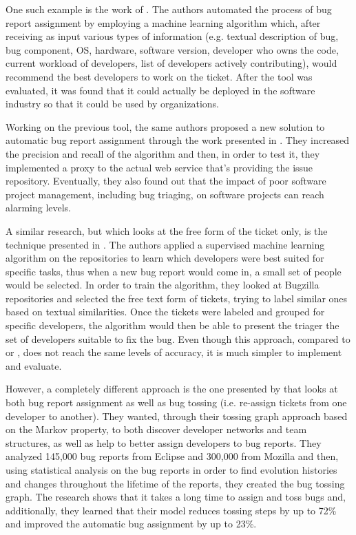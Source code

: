 \documentclass{mprop}
\begin{document}
One such example is the work of \citet{anvik2006automating}. The authors
automated the process of bug report assignment by employing a machine learning 
algorithm which, after receiving as input various types of information (e.g. 
textual description of bug, bug component, OS, hardware, software version, 
developer who owns the code, current workload of developers, list of developers 
actively contributing), would recommend the best developers to work on the ticket. 
After the tool was evaluated, it was found that it could actually be deployed
in the software industry so that it could be used by organizations.

Working on the previous tool, the same authors proposed a new solution to automatic
bug report assignment through the work presented in \citet{anvik2011reducing}.
They increased the precision and recall of the algorithm and then, in order to 
test it, they implemented a proxy to the actual web service that's providing the
issue repository. Eventually, they also found out that the impact of poor
software project management, including bug triaging, on software projects can
reach alarming levels.

A similar research, but which looks at the free form of the ticket only, is
the technique presented in \citet{anvik2006should}. The authors applied a 
supervised machine learning algorithm on the repositories to learn which 
developers were best suited for specific tasks, thus when a new bug report would 
come in, a small set of people would be selected. In order to train the algorithm,
they looked at Bugzilla repositories and selected the free text form of tickets, 
trying to label similar ones based on textual similarities. Once the tickets were
labeled and grouped for specific developers, the algorithm would then be able
to present the triager the set of developers suitable to fix the bug. Even though
this approach, compared to \citet{anvik2006automating} or 
\citet{anvik2011reducing}, does not reach the same levels of accuracy, it is much
simpler to implement and evaluate.

However, a completely different approach is the one presented by 
\citet{jeong2009improving} that looks at both bug report assignment as well as bug 
tossing (i.e. re-assign tickets from one developer to another). They wanted, 
through their tossing graph approach based on the Markov property, to both 
discover developer networks and team structures, as well as help to better assign 
developers to bug reports. They analyzed 145,000 bug reports from Eclipse and 
300,000 from Mozilla and then, using statistical analysis on the bug reports in 
order to find evolution histories and changes throughout the lifetime of the 
reports, they created the bug tossing graph. The research shows that it takes a 
long time to assign and toss bugs and, additionally, they learned that their model 
reduces tossing steps by up to 72\% and improved the automatic bug assignment by 
up to 23\%.
\end{document}

